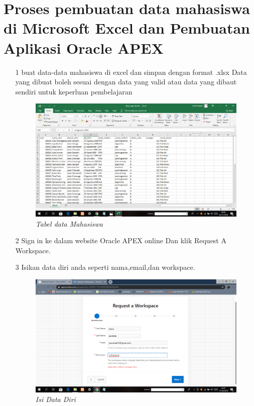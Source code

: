 \chapter{Proses pembuatan data mahasiswa di Microsoft Excel dan Pembuatan Aplikasi Oracle APEX}

\begin{enumerate}
\item[1]buat data-data mahasiswa di excel dan simpan dengan format .xlsx Data yang dibuat boleh sesuai dengan data yang valid atau data yang dibaut sendiri untuk keperluan pembelajaran
    \begin{figure}[!htbp]
    \begin{center}
    \includegraphics[scale=0.2]{figures/data.png}
    \caption{\textit{Tabel data Mahasiswa}}
    \end{center}   
    \end{figure}
\item[2]Sign in ke dalam website Oracle APEX online Dan klik Request A Workspace.

  
    

\item[3]Isikan data diri anda seperti nama,email,dan workspace.
 \begin{figure}[!htbp]
    \begin{center}
    \includegraphics[scale=0.2]{figures/requestworkspace.png}
    \caption{\textit{Isi Data Diri}}
    \end{center}   
    \end{figure}
  

\end{enumerate}
